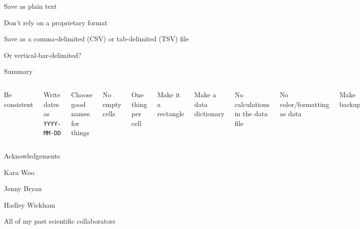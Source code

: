 \documentclass[aspectratio=169,12pt,t]{beamer}
\begin{document}
\begin{frame}{Save as plain text}

  \bbi
\item Don't rely on a proprietary format
\item Save as a comma-delimited (CSV) or tab-delimited (TSV) file
  \bi
\item[] Or vertical-bar-delimited?
  \ei
  \ei

  \note{
  }
\end{frame}




\begin{frame}{Summary}

  \begin{columns}


    \bbe
  \item Be consistent
  \item Write dates as {\tt YYYY-MM-DD}
  \item Choose good names for things
  \item No empty cells
  \item One thing per cell
  \item Make it a rectangle
    \ee


    \bbe
    \addtocounter{enumi}{6}
  \item Make a data dictionary
  \item No calculations in the data file
  \item No color/formatting as data
  \item Make backups
  \item Use data validation
  \item Save as plain text
    \ee

    \end{columns}



\end{frame}




\begin{frame}{Acknowledgements}


  \bbi
\item[] Kara Woo
\item[] Jenny Bryan
\item[] Hadley Wickham
\item[] All of my past scientific collaborators
  \ei


\end{frame}
\end{document}
